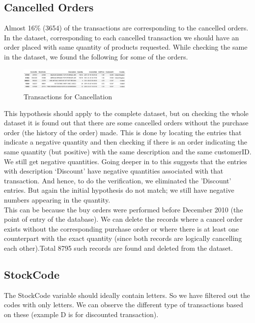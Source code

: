 \subsection{Cancelled Orders}

Almost 16\% (3654) of the transactions are corresponding to the cancelled orders. In the dataset, corresponding to each cancelled transaction we should have an order placed with same quantity of products requested. While checking the same in the dataset, we found the following for some of the orders.\\

\begin{figure}[H]
\caption{Transactions for Cancellation}
\label{2.3}
\centering
\includegraphics[width=0.5\textwidth]{images/2_3.PNG}
\end{figure}

This hypothesis should apply to the complete dataset, but on checking the whole dataset it is found out that there are some cancelled orders without the purchase order (the history of the order) made. This is done by locating the entries that indicate a negative quantity and then checking if there is an order indicating the same quantity (but positive) with the same description and the same customerID. We still get negative quantities. Going deeper in to this suggests that the entries with description `Discount' have negative quantities associated with that transaction. And hence, to do the verification, we eliminated the 'Discount' entries. But again the initial hypothesis do not match; we still have negative numbers appearing in the quantity.\\
This can be because the buy orders were performed before December 2010 (the point of entry of the database). We can delete the records where a cancel order exists without the corresponding purchase order or where there is at least one counterpart with the exact quantity (since both records are logically cancelling each other).Total 8795 such records are found and deleted from the dataset.\\

\subsection{StockCode}

The StockCode variable should ideally contain letters. So we have filtered out the codes with only letters. We can observe the different type of transactions based on these (example D is for discounted transaction).\\


